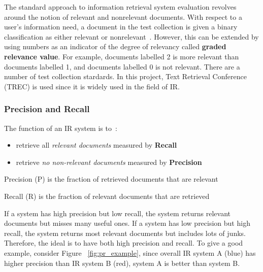 The standard approach to information retrieval system evaluation revolves around the notion of relevant and nonrelevant documents. With respect 
to a user's information need, a document in the test collection is given a binary classification as either relevant or nonrelevant~\cite{evalweb}. However,
this can be extended by using numbers as an indicator of the degree of relevancy called \textbf{graded relevance value}. For example, documents labelled 2 is more relevant than documents
labelled 1, and documents labelled 0 is not relevant. There are a number of test collection stardards. In this project, Text Retrieval Conference (TREC)
is used since it is widely used in the field of IR.

\subsubsection{Precision and Recall}
The function of an IR system is to~\cite[P. 10]{eval}:
\begin{itemize}
 \item retrieve all \textit{relevant documents} measured by \textbf{Recall}
 \item retrieve \textit{no non-relevant documents} measured by \textbf{Precision}
\end{itemize}

Precision (P) is the fraction of retrieved documents that are relevant 
\begin{center}
\end{center}

Recall (R) is the fraction of relevant documents that are retrieved 
\begin{center}
\end{center}

If a system has high precision but low recall, the system returns relevant documents but misses many useful ones.
If a system has low precision but high recall, the system returns most relevant documents but includes lots of junks.
Therefore, the ideal is to have both high precision and recall. To give a good example, consider Figure ~\ref{fig:pr_example}, since
overall IR system A (blue) has higher precision than IR system B (red), system A is better than system B.


